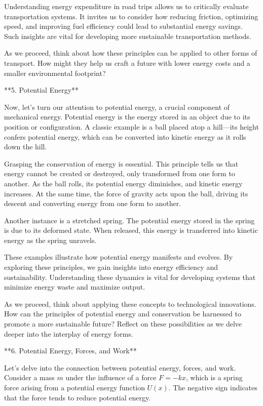 \begin{tcolorbox}[size=title,opacityfill=0.05,breakable]
Understanding energy expenditure in road trips allows us to critically evaluate transportation systems. It invites us to consider how reducing friction, optimizing speed, and improving fuel efficiency could lead to substantial energy savings. Such insights are vital for developing more sustainable transportation methods.

As we proceed, think about how these principles can be applied to other forms of transport. How might they help us craft a future with lower energy costs and a smaller environmental footprint?

**5. Potential Energy**

Now, let's turn our attention to potential energy, a crucial component of mechanical energy. Potential energy is the energy stored in an object due to its position or configuration. A classic example is a ball placed atop a hill—its height confers potential energy, which can be converted into kinetic energy as it rolls down the hill.

Grasping the conservation of energy is essential. This principle tells us that energy cannot be created or destroyed, only transformed from one form to another. As the ball rolls, its potential energy diminishes, and kinetic energy increases. At the same time, the force of gravity acts upon the ball, driving its descent and converting energy from one form to another.

Another instance is a stretched spring. The potential energy stored in the spring is due to its deformed state. When released, this energy is transferred into kinetic energy as the spring unravels.

These examples illustrate how potential energy manifests and evolves. By exploring these principles, we gain insights into energy efficiency and sustainability. Understanding these dynamics is vital for developing systems that minimize energy waste and maximize output.

As we proceed, think about applying these concepts to technological innovations. How can the principles of potential energy and conservation be harnessed to promote a more sustainable future? Reflect on these possibilities as we delve deeper into the interplay of energy forms.

**6. Potential Energy, Forces, and Work**

Let's delve into the connection between potential energy, forces, and work. Consider a mass \( m \) under the influence of a force \( F = -kx \), which is a spring force arising from a potential energy function \( U(x) \). The negative sign indicates that the force tends to reduce potential energy.


\end{tcolorbox}

